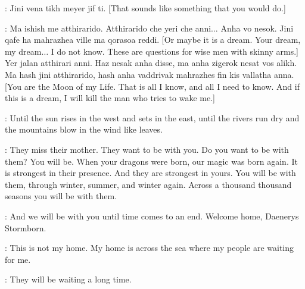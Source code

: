 \DAENERYS: Jini vena tikh meyer jif ti. [That sounds like something that you would do.]


\DROGO: Ma ishish me atthirarido. Atthirarido che yeri che anni$\ldots$ Anha vo nesok.  Jini qafe ha mahrazhea ville ma qorasoa reddi. [Or maybe it is a dream. Your dream, my dream$\ldots$ I do not know. These are questions for wise men with skinny arms.] Yer jalan atthirari anni. Haz nesak anha disse, ma anha zigerok nesat vos alikh.  Ma hash jini atthirarido, hash anha vaddrivak mahrazhes fin kis vallatha anna. [You are the Moon of my Life. That is all I know, and all I need to know. And if this is a dream, I will kill the man who tries to wake me.] 




\DAENERYS: Until the sun rises in the west and sets in the east, until the rivers run dry and the mountains blow in the wind like leaves.

 
\PYAT: They miss their mother. They want to be with you. Do you want to be with them? You will be. When your dragons were born, our magic was born again. It is strongest in their presence. And they are strongest in yours. You will be with them, through winter, summer, and winter again. Across a thousand thousand seasons you will be with them. 


\PYAT: And we will be with you until time comes to an end. Welcome home, Daenerys Stormborn. 

\DAENERYS: This is not my home. My home is across the sea where my people are waiting for me. 

\PYAT: They will be waiting a long time. 

